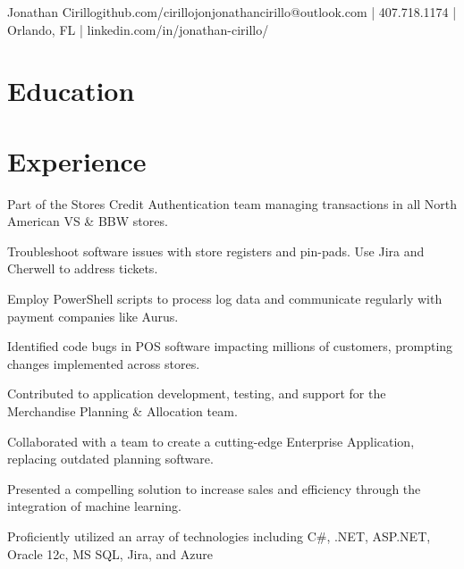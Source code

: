\documentclass[]{deedy-resume-openfont}
\begin{document}
%
%


\namesection \LARGE {{Jonathan} {Cirillo}}{github.com/cirillojon}{jonathancirillo@outlook.com | 407.718.1174 | Orlando, FL | linkedin.com/in/jonathan-cirillo/}

\hspace{\parindent}

\section{Education}
\sectionsep

\section{Experience}

\vspace{\topsep} 

\begin{tightemize}
\item Part of the Stores Credit Authentication team managing transactions in all North American VS \& BBW stores.
\item Troubleshoot software issues with store registers and pin-pads. Use Jira and Cherwell to address tickets. 
\item Employ PowerShell scripts to process log data and communicate regularly with payment companies like Aurus.
\item Identified code bugs in POS software impacting millions of customers, prompting changes implemented across stores.
\end{tightemize}
\sectionsep

\begin{tightemize}
\item Contributed to application development, testing, and support for the Merchandise Planning \& Allocation team.
\item Collaborated with a team to create a cutting-edge Enterprise Application, replacing outdated planning software.  
\item Presented a compelling solution to increase sales and efficiency through the integration of machine learning.
\item Proficiently utilized an array of technologies including C\#, .NET, ASP.NET, Oracle 12c, MS SQL, Jira, and Azure
\end{tightemize}
\sectionsep
\end{document}
